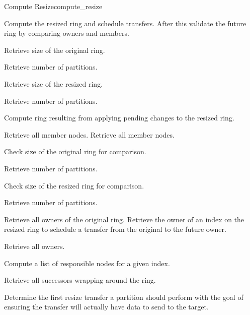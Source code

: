\begin{actionbox}{Compute Resize}{compute_resize}
	\small
	\begin{action}
		 Compute the resized ring and schedule transfers.
		After this validate the future ring by comparing owners and members.
		\begin{action}
			 Retrieve size of the original ring.
			\begin{action}
				 Retrieve number of partitions.
			\end{action}
			 Retrieve size of the resized ring.
			\begin{action}
				 Retrieve number of partitions.
			\end{action}
			 Compute ring resulting from applying pending changes to the resized ring.
			\begin{action}
				 Retrieve all member nodes.
				 Retrieve all member nodes.
			\end{action}
			 Check size of the original ring for comparison.
			\begin{action}
				 Retrieve number of partitions.
			\end{action}
			 Check size of the resized ring for comparison.
			\begin{action}
				 Retrieve number of partitions.
			\end{action}
			 Retrieve all owners of the original ring.
			 Retrieve the owner of an index on the resized ring to schedule a transfer from the original to the future owner.
			\begin{action}
				 Retrieve all owners.
			\end{action}
			 Compute a list of responsible nodes for a given index.
			\begin{action}
				 Retrieve all successors wrapping around the ring.
			\end{action}
			 Determine the first resize transfer a partition should perform with the goal of ensuring the transfer will actually have data to send to the target.

\end{action}
\end{action}
\end{actionbox}
